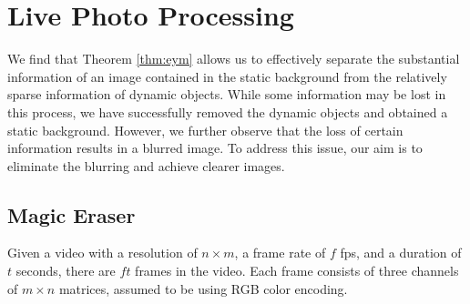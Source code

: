 \documentclass[12pt]{article}
\theoremstyle{definition}
\begin{document}
\section{Live Photo Processing}
We find that Theorem \ref{thm:eym} allows us to effectively separate the substantial information of an image contained in the static background from the relatively sparse information of dynamic objects. While some information may be lost in this process, we have successfully removed the dynamic objects and obtained a static background. However, we further observe that the loss of certain information results in a blurred image. To address this issue, our aim is to eliminate the blurring and achieve clearer images.

\subsection{Magic Eraser} \label{subsec:magic_eraser}
Given a video with a resolution of $n\times m$, a frame rate of $f$ fps, and a duration of $t$ seconds, there are $ft$ frames in the video. Each frame consists of three channels of $m\times n$ matrices, assumed to be using RGB color encoding.
\end{document}
